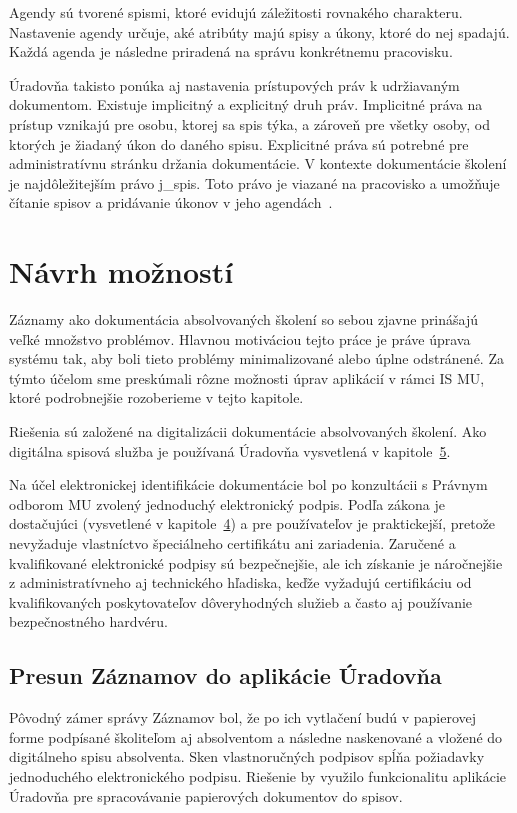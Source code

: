 \documentclass[
  digital,     %
  oneside,     %
  nosansbold,  %
  nocolorbold, %
  lof,         %
  nolot,         %
]{fithesis4}
\begin{document}
Agendy sú tvorené spismi, ktoré evidujú záležitosti rovnakého charakteru. Nastavenie agendy určuje, aké atribúty majú spisy a úkony, ktoré do nej spadajú. Každá agenda je následne priradená na správu konkrétnemu pracovisku.~\cite{uradovna2024}

Úradovňa takisto ponúka aj nastavenia prístupových práv k udržiavaným dokumentom. Existuje implicitný a explicitný druh práv. Implicitné práva na prístup vznikajú pre osobu, ktorej sa spis týka, a zároveň pre všetky osoby, od ktorých je žiadaný úkon do daného spisu. Explicitné práva sú potrebné pre administratívnu stránku držania dokumentácie. V kontexte dokumentácie školení je najdôležitejším právo j\_spis. Toto právo je viazané na pracovisko a umožňuje čítanie spisov a pridávanie úkonov v jeho agendách~\cite{uradovna2024}.

\chapter{Návrh možností}
\label{kap-6}
Záznamy ako dokumentácia absolvovaných školení so sebou zjavne prinášajú veľké množstvo problémov. Hlavnou motiváciou tejto práce je práve úprava systému tak, aby boli tieto problémy minimalizované alebo úplne odstránené. Za týmto účelom sme preskúmali rôzne možnosti úprav aplikácií v rámci IS MU, ktoré podrobnejšie rozoberieme v tejto kapitole.

Riešenia sú založené na digitalizácii dokumentácie absolvovaných školení. Ako digitálna spisová služba je používaná Úradovňa vysvetlená v kapitole~\hyperref[kap-5]{5}.

Na účel elektronickej identifikácie dokumentácie bol po konzultácii s Právnym odborom MU zvolený jednoduchý elektronický podpis. Podľa zákona je dostačujúci (vysvetlené v kapitole~\hyperref[kap-4]{4}) a pre používateľov je praktickejší, pretože nevyžaduje vlastníctvo špeciálneho certifikátu ani zariadenia. Zaručené a kvalifikované elektronické podpisy sú bezpečnejšie, ale ich získanie je náročnejšie z administratívneho aj technického hľadiska, keďže vyžadujú certifikáciu od kvalifikovaných poskytovateľov dôveryhodných služieb a často aj používanie bezpečnostného hardvéru.

\section{Presun Záznamov do aplikácie Úradovňa}
Pôvodný zámer správy Záznamov bol, že po ich vytlačení budú v papierovej forme podpísané školiteľom aj absolventom a následne naskenované a vložené do digitálneho spisu absolventa. Sken vlastnoručných podpisov spĺňa požiadavky jednoduchého elektronického podpisu. Riešenie by využilo funkcionalitu aplikácie Úradovňa pre spracovávanie papierových dokumentov do spisov. 
\end{document}
